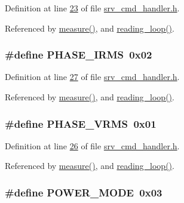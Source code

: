 Definition at line \hyperlink{a00043_source_l00023}{23} of file \hyperlink{a00043_source}{srv\-\_\-cmd\-\_\-handler.\-h}.



Referenced by \hyperlink{a00042_source_l00040}{measure()}, and \hyperlink{a00035_source_l00302}{reading\-\_\-loop()}.

\hypertarget{a00043_a15c9ccf287820001431c33c4bb25a23b}{
\subsubsection[{P\-H\-A\-S\-E\-\_\-\-I\-R\-M\-S}]{\setlength{\rightskip}{0pt plus 5cm}\#define P\-H\-A\-S\-E\-\_\-\-I\-R\-M\-S~0x02}}\label{d6/d42/a00043_a15c9ccf287820001431c33c4bb25a23b}


Definition at line \hyperlink{a00043_source_l00027}{27} of file \hyperlink{a00043_source}{srv\-\_\-cmd\-\_\-handler.\-h}.



Referenced by \hyperlink{a00042_source_l00040}{measure()}, and \hyperlink{a00035_source_l00302}{reading\-\_\-loop()}.

\hypertarget{a00043_af0c09c5a455410e6fbd35fd55221338f}{
\subsubsection[{P\-H\-A\-S\-E\-\_\-\-V\-R\-M\-S}]{\setlength{\rightskip}{0pt plus 5cm}\#define P\-H\-A\-S\-E\-\_\-\-V\-R\-M\-S~0x01}}\label{d6/d42/a00043_af0c09c5a455410e6fbd35fd55221338f}


Definition at line \hyperlink{a00043_source_l00026}{26} of file \hyperlink{a00043_source}{srv\-\_\-cmd\-\_\-handler.\-h}.



Referenced by \hyperlink{a00042_source_l00040}{measure()}, and \hyperlink{a00035_source_l00302}{reading\-\_\-loop()}.

\hypertarget{a00043_a4e7bf0c205872c6db180b06792a62118}{
\subsubsection[{P\-O\-W\-E\-R\-\_\-\-M\-O\-D\-E}]{\setlength{\rightskip}{0pt plus 5cm}\#define P\-O\-W\-E\-R\-\_\-\-M\-O\-D\-E~0x03}}\label{d6/d42/a00043_a4e7bf0c205872c6db180b06792a62118}


